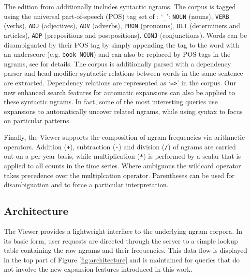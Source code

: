 \documentclass[11pt,a4paper]{article}
\newcommand{\query}[1]{\texttt{#1}}
\begin{document}
The edition from  additionally includes syntactic ngrams. The corpus is tagged using the universal part-of-speech (POS) tag set of : `\query{\_}': \query{NOUN} (nouns), \query{VERB} (verbs), \query{ADJ} (adjectives), \query{ADV} (adverbs), \query{PRON} (pronouns), \query{DET} (determiners and articles), \query{ADP} (prepositions and postpositions), \query{CONJ} (conjunctions). Words can be disambiguated by their POS tag by simply appending the tag to the word with an underscore (e.g. \texttt{book\_NOUN}) and can also be replaced by POS tags in the ngrams, see  for details. The corpus is additionally parsed with a dependency parser and head-modifier syntactic relations between words in the same sentence are extracted. Dependency relations are represented as `\query{=>}' in the corpus. Our new enhanced search features for automatic expansions can also be applied to these syntactic ngrams. In fact, some of the most interesting queries use expansions to automatically uncover related ngrams, while using syntax to focus on particular patterns.

Finally, the Viewer supports the composition of ngram frequencies via arithmetic operators. Addition (\query{+}), subtraction (\query{-}) and division (\query{/}) of ngrams are carried out on a per year basis, while multiplication (\query{*}) is performed by a scalar that is applied to all counts in the time series. Where ambiguous the wildcard operator takes precedence over the multiplcation operator. Parentheses can be used for disambiguation and to force a particular interpretation.

\subsection{Architecture}
The Viewer provides a lightweight interface to the underlying ngram corpora. In its basic form, user requests are directed through the server to a simple lookup table containing the raw ngrams and their frequencies. This data flow is displayed in the top part of Figure \ref{fig:architecture} and is maintained for queries that do not involve the new expansion features introduced in this work.
\end{document}
